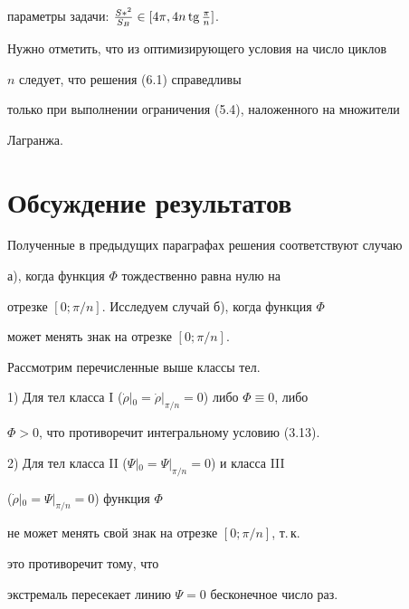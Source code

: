 параметры задачи: $\frac{S*^2}{S_B} \in [4 \pi, 4 n  \tg


\frac{\pi}{n} ]$.





Нужно отметить, что из оптимизирующего условия на число циклов


$n$ следует, что решения (6.1) справедливы


только при выполнении ограничения (5.4), наложенного на множители


Лагранжа.








\section{Обсуждение результатов}





Полученные в предыдущих параграфах решения соответствуют случаю


а), когда функция $\Phi$ тождественно равна нулю на


отрезке $[0; \pi / n]$. Исследуем случай б), когда функция $\Phi$


может менять знак на отрезке $[0; \pi / n]$.


Рассмотрим перечисленные выше классы тел.





1) Для тел класса I ($\Dot{\rho} |_0 =


\Dot{\rho} |_{\pi / n} = 0$) либо $\Phi \equiv 0$, либо


$\Phi > 0$, что противоречит интегральному условию (3.13).





2) Для тел класса II ($\Psi |_0 =


\Psi |_{\pi / n} = 0$) и класса III


($\Dot{\rho} |_0 =


\Psi |_{\pi / n} = 0$) функция $\Phi$


не может менять свой знак на отрезке $[0; \pi / n]$, т.\,к.


это противоречит тому, что


экстремаль пересекает линию $\Psi = 0$ бесконечное число раз.





